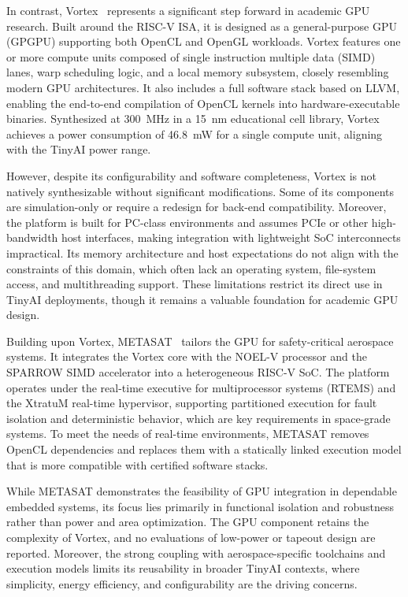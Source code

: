                 In contrast, Vortex~\cite{vortex} represents a significant step forward in academic GPU research. Built around the RISC-V ISA, it is designed as a general-purpose GPU (GPGPU) supporting both OpenCL and OpenGL workloads. Vortex features one or more compute units composed of single instruction multiple data (SIMD) lanes, warp scheduling logic, and a local memory subsystem, closely resembling modern GPU architectures. It also includes a full software stack based on LLVM, enabling the end-to-end compilation of OpenCL kernels into hardware-executable binaries. Synthesized at \SI{300}{\mega\hertz} in a \SI{15}{\nano\meter} educational cell library, Vortex achieves a power consumption of \SI{46.8}{\milli\watt} for a single compute unit, aligning with the TinyAI power range.
                
                However, despite its configurability and software completeness, Vortex is not natively synthesizable without significant modifications. Some of its components are simulation-only or require a redesign for back-end compatibility. Moreover, the platform is built for PC-class environments and assumes PCIe or other high-bandwidth host interfaces, making integration with lightweight SoC interconnects impractical. Its memory architecture and host expectations do not align with the constraints of this domain, which often lack an operating system, file-system access, and multithreading support. These limitations restrict its direct use in TinyAI deployments, though it remains a valuable foundation for academic GPU design.
                
                Building upon Vortex, METASAT~\cite{metasat} tailors the GPU for safety-critical aerospace systems. It integrates the Vortex core with the NOEL-V processor and the SPARROW SIMD accelerator into a heterogeneous RISC-V SoC. The platform operates under the real-time executive for multiprocessor systems (RTEMS) and the XtratuM real-time hypervisor, supporting partitioned execution for fault isolation and deterministic behavior, which are key requirements in space-grade systems. To meet the needs of real-time environments, METASAT removes OpenCL dependencies and replaces them with a statically linked execution model that is more compatible with certified software stacks.
                
                While METASAT demonstrates the feasibility of GPU integration in dependable embedded systems, its focus lies primarily in functional isolation and robustness rather than power and area optimization. The GPU component retains the complexity of Vortex, and no evaluations of low-power or tapeout design are reported. Moreover, the strong coupling with aerospace-specific toolchains and execution models limits its reusability in broader TinyAI contexts, where simplicity, energy efficiency, and configurability are the driving concerns.
                

